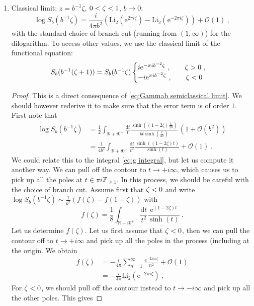 \documentclass[12pt,a4paper]{article}
\newcommand{\be}{\begin{equation}}
\newcommand{\ee}{\end{equation}}
\newcommand\ZZ{\mathbb{Z}}
\newcommand\RR{\mathbb{R}}
\newcommand\Li{\text{Li}}
\let\Re\relax
\DeclareMathOperator\Re{Re}
\let\Im\relax
\DeclareMathOperator\Im{Im}
\begin{document}
\begin{enumerate}
    \item Classical limit: $z=b^{-1} \zeta$, $0<\Re \zeta<1$, $b \to 0$:
    \be 
        \log S_b(b^{-1} \zeta) = \frac{i}{4\pi b^2}\left(\Li_2(\mathrm{e}^{2\pi i \zeta})-\Li_2(\mathrm{e}^{-2\pi i \zeta})\right)+\mathcal{O}(1)\ , \label{eq:S_b classical limit}
    \ee
    with the standard choice of branch cut (running from $(1,\infty)$) for the dilogarithm. To access other values, we use the classical limit of the functional equation:
    \be 
      S_b(b^{-1}(\zeta+1))= S_b(b^{-1}\zeta)\begin{cases}
      i \mathrm{e}^{-\pi i b^{-2} \zeta}\ , \qquad \Im \zeta>0\ , \\
      -i \mathrm{e}^{\pi i b^{-2} \zeta}\ , \qquad \Im \zeta<0
      \end{cases}
    \ee
    \begin{proof}
           This is a direct consequence of \eqref{eq:Gammab semiclassical limit}. We should however rederive it to make sure that the error term is of order $1$. First note that
\begin{align}
    \log S_b(b^{-1} \zeta)&=\frac{1}{2}\int_{\RR+i 0^+} \frac{\mathrm{d}t}{t} \frac{\sinh((1-2\zeta)\frac{t}{2b})}{b t \sinh(\frac{t}{2b})}\, \left(1+\mathcal{O}(b^2)\right) \\
    &=\frac{1}{4b^2} \int_{\RR+i 0^+} \frac{\mathrm{d}t}{t^2} \frac{\sinh((1-2\zeta) t)}{\sinh(t)}+\mathcal{O}(1)\ .
\end{align}
We could relate this to the integral \eqref{eq:g integral}, but let us compute it another way. We can pull off the contour to $t \to +i \infty$, which causes us to pick up all the poles at $t \in  \pi i \ZZ_{\ge 1}$. In this process, we should be careful with the choice of branch cut. Assume first that $\Im \zeta<0$ and write $\log S_b(b^{-1} \zeta) \sim \frac{1}{b^2}\left(f(\zeta)-f(1-\zeta)\right)$ with  
\be 
f(\zeta)=\frac{1}{8} \int_{\RR+i 0^+} \frac{\mathrm{d}t}{t^2} \frac{\mathrm{e}^{(1-2\zeta) t}}{\sinh(t)}\ .
\ee
Let us determine $f(\zeta)$. Let us first assume that $\Im \zeta<0$, then we can pull the contour off to $t \to +i \infty$ and pick up all the poles in the process (including at the origin.
We obtain
\begin{align}
    f(\zeta)&=-\frac{i}{4\pi} \sum_{n=1}^\infty \frac{\mathrm{e}^{-2\pi i n \zeta}}{n^2} +\mathcal{O}(1)\\
    &=-\frac{i}{4\pi} \Li_2\left(\mathrm{e}^{-2\pi i \zeta}\right)\ ,
\end{align}
For $\Im \zeta<0$, we should pull off the contour instead to $t \to -i \infty$ and pick up all the other poles. This gives

\end{proof}
\end{enumerate}
\end{document}
